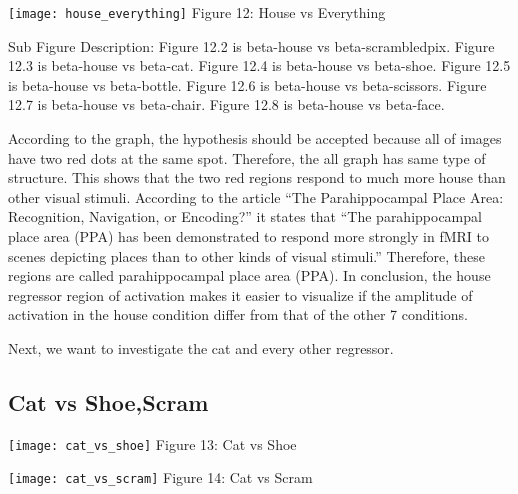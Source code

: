 \documentclass[12pt]{article}
\begin{document}
    \centering
        \texttt{[image: house\_everything]}
Figure 12: House vs Everything
\newline


Sub Figure Description:
\newline
{\hfil Figure 12.2 is beta-house vs beta-scrambledpix.\hfil}
\newline
{\hfil Figure 12.3 is beta-house vs beta-cat. \hfil}
\newline
{\hfil Figure 12.4 is beta-house vs beta-shoe.\hfil}
\newline
{\hfil Figure 12.5 is beta-house vs beta-bottle. \hfil}
\newline
{\hfil Figure 12.6 is beta-house vs beta-scissors.\hfil}
\newline
{\hfil Figure 12.7 is beta-house vs beta-chair. \hfil}
\newline
{\hfil Figure 12.8 is beta-house vs beta-face.\hfil}
\newline




According to the graph, the hypothesis should be accepted because all of images have two red dots at the same spot. Therefore, the all graph has same type of structure. This shows that the two red regions respond to much more house than other visual stimuli. According to the article “The Parahippocampal Place Area: Recognition, Navigation, or Encoding?” \cite{epstein1999ppa} it states that “The parahippocampal place area (PPA) has been demonstrated to respond more strongly in fMRI to scenes depicting places than to other kinds of visual stimuli.” Therefore, these regions are called parahippocampal place area (PPA). In conclusion, the house regressor region of activation makes it easier to visualize if the amplitude of activation in the house condition differ from that of the other 7 conditions. 

Next, we want to investigate the cat and every other regressor. 

\subsection{Cat vs Shoe,Scram}


    \centering
      \texttt{[image: cat\_vs\_shoe]}
Figure 13: Cat vs Shoe
    


    \centering
      \texttt{[image: cat\_vs\_scram]}
Figure 14: Cat vs Scram
\end{document}
